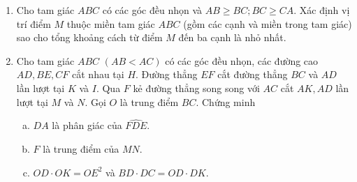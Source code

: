 \begin{ex}%
	\begin{enumerate}[1.]
		\item 

	Cho tam giác $ABC$ có các góc đều nhọn và $AB\geqslant BC; BC\geqslant CA$. Xác định vị trí điểm $M$ thuộc miền tam giác $ABC$ (gồm các cạnh và miền trong tam giác) sao cho tổng khoảng cách từ điểm $M$ đến ba cạnh là nhỏ nhất.
	\item 	Cho tam giác $ABC$ $(AB < AC)$ có các góc đều nhọn, các đường cao $AD,BE,CF$ cắt nhau tại $H$. Đường thẳng $EF$ cắt đường thẳng $BC$ và $AD$ lần lượt tại $K$ và $I$. Qua $F$ kẻ đường thẳng song song với $AC$ cắt $AK,AD$ lần lượt tại $M$ và $N$. Gọi $O$ là trung điểm $BC$. Chứng minh
	\begin{enumerate}[a)]%
		\item $DA$ là phân giác của $\widehat{FDE}$.
		\item $F$ là trung điểm của $MN$.
		\item $OD \cdot	 OK = OE^2$ và $BD \cdot DC = OD \cdot DK$.
		\end{enumerate}
	\end{enumerate}
	\loigiai{
		\begin{enumerate}[1.]
			\item 
	

\end{enumerate}}
\end{ex}
